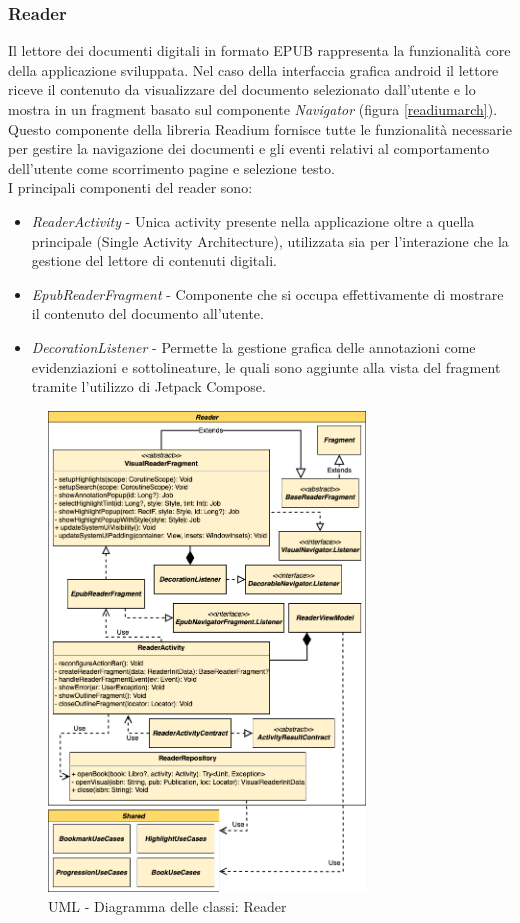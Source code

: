 \subsubsection{Reader}
Il lettore dei documenti digitali in formato EPUB rappresenta la funzionalità core della applicazione sviluppata. Nel caso della interfaccia grafica android il lettore riceve il contenuto da visualizzare del documento selezionato dall'utente e lo mostra in un fragment basato sul componente \textit{Navigator} (figura \ref{readiumarch}). Questo componente della libreria Readium fornisce tutte le funzionalità necessarie per gestire la navigazione dei documenti e gli eventi relativi al comportamento dell'utente come scorrimento pagine e selezione testo. \\
I principali componenti del reader sono:
\begin{itemize}
    \item \textit{ReaderActivity} - Unica activity presente nella applicazione oltre a quella principale (Single Activity Architecture), utilizzata sia per l’interazione che la gestione del lettore di contenuti digitali.
    \item \textit{EpubReaderFragment} - Componente che si occupa effettivamente di mostrare il contenuto del documento all'utente.
    \item \textit{DecorationListener} - Permette la gestione grafica delle annotazioni come evidenziazioni e sottolineature, le quali sono aggiunte alla vista del fragment tramite l'utilizzo di Jetpack Compose.
\end{itemize}

\begin{figure}[H]
\centering
\includegraphics[width=0.75\textwidth]{img/tesi-2-Page-16.drawio.png}
\caption{UML - Diagramma delle classi: Reader}
\label{reader}
\end{figure}


